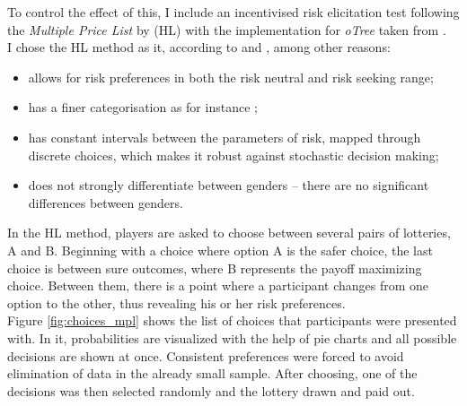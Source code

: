     To control the effect of this, I include an incentivised risk elicitation test following the \textit{Multiple Price List} by \cite{holt2002} (HL) with the implementation for \textit{oTree} taken from \cite{holzmeister2017}.\\
    
    I chose the HL method as it, according to \cite{crosetto2016} and \cite{harrison2008}, among other reasons:
    \begin{itemize}
        \item allows for risk preferences in both the risk neutral and risk seeking range;
        \item has a finer categorisation as for instance \cite{eckel2008};
        \item has constant intervals between the parameters of risk, mapped through discrete choices, which makes it robust against stochastic decision making;
        \item does not strongly differentiate between genders -- there are no significant differences between genders.
    \end{itemize}  
       
     In the HL method, players are asked to choose between several pairs of lotteries, A and B. Beginning with a choice where option A is the safer choice, the last choice is between sure outcomes, where B represents the payoff maximizing choice. Between them, there is a point where a participant changes from one option to the other, thus revealing his or her risk preferences.\\
     
     Figure \ref{fig:choices_mpl} shows the list of choices that participants were presented with. In it, probabilities are visualized with the help of pie charts and all possible decisions are shown at once. Consistent preferences were forced to avoid elimination of data in the already small sample. After choosing, one of the decisions was then selected randomly and the lottery drawn and paid out.\\
     
